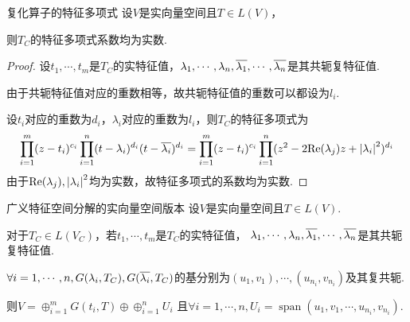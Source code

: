 \begin{theorem}[9.20]\label{thm 9.20} 复化算子的特征多项式 \:
    设\(V\)是实向量空间且\(T \in L(V)\)，
    
    则\(T_C\)的特征多项式系数均为实数.
\end{theorem}

\begin{proof}
    设\(t_1,\cdots,t_m\)是\(T_C\)的实特征值，\(\lambda_1,\cdots,\lambda_n,\ol{\lambda_1},\cdots,\ol{\lambda_n}\)是其共轭复特征值.

    由于共轭特征值对应的重数相等，故共轭特征值的重数可以都设为\(l_i\).
    
    设\(t_i\)对应的重数为\(d_i\)，\(\lambda_i\)对应的重数为\(l_i\)，则\(T_C\)的特征多项式为
        \begin{align*}
            \prod_{i=1}^m (z-t_i)^{c_i} \prod_{i=1}^n (t-\lambda_i)^{d_i}(t-\ol{\lambda_i})^{d_i}
            =\prod_{i=1}^m (z-t_i)^{c_i} \prod_{i=1}^n (z^2-2\mathrm{Re}(\lambda_j)z+\abs*{\lambda_i}^2)^{d_i}
        \end{align*}
    由于\(\mathrm{Re}(\lambda_j),\abs*{\lambda_i}^2\)均为实数，故特征多项式的系数均为实数.
\end{proof}

\newpage

\begin{theorem}[9.1*]\label{thm 9.1*} 广义特征空间分解的实向量空间版本 \:
    设\(V\)是实向量空间且\(T \in L(V)\).

    对于\(T_C \in L(V_C)\)，若\(t_1,\cdots,t_m\)是\(T_C\)的实特征值，
    \(\lambda_1,\cdots,\lambda_n,\ol{\lambda_1},\cdots,\ol{\lambda_n}\)是其共轭复特征值.
    
    \(\forall i=1,\cdots,n,G(\lambda_i,T_C),G(\ol{\lambda_i},T_C)\)的基分别为\((u_1,v_1),\cdots,(u_{n_i},v_{n_i})\)及其复共轭.
    
    则\(V=\oplus_{i=1}^m G(t_i,T) \oplus \oplus_{i=1}^n U_i\)
    且\(\forall i=1,\cdots,n,U_i=\operatorname{span}(u_1,v_1,\cdots,u_{n_i},v_{n_i})\).
\end{theorem}

